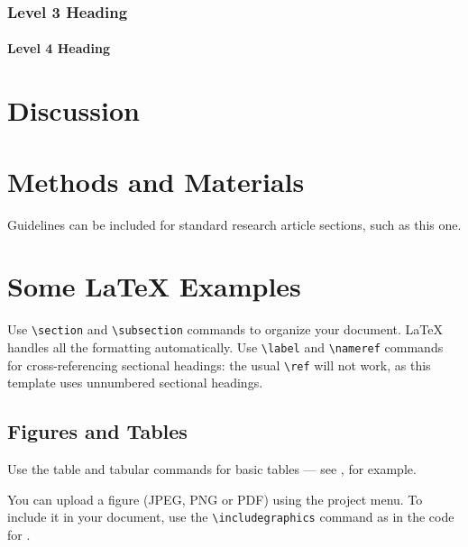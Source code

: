 \documentclass[9pt,lineno]{elife}
\begin{document}
\lipsum[3]

\subsubsection{Level 3 Heading}

\lipsum[5]

\paragraph{Level 4 Heading}
\lipsum[7]

\section{Discussion}

\lipsum[9]

\section{Methods and Materials}

Guidelines can be included for standard research article sections, such as this one. 

\lipsum[3]

\section{Some \LaTeX{} Examples}
\label{sec:examples}

Use \verb|\section| and \verb|\subsection| commands to organize your document. \LaTeX{} handles all the formatting automatically. Use \verb|\label| and \verb|\nameref| commands for cross-referencing sectional headings: the usual \verb|\ref| will not work, as this template uses unnumbered sectional headings.

\subsection{Figures and Tables}

Use the table and tabular commands for basic tables --- see , for example. 

You can upload a figure (JPEG, PNG or PDF) using the project menu. To include it in your document, use the \verb|\includegraphics| command as in the code for . 
\end{document}

